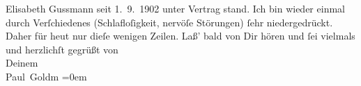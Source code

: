 \begin{ledgroupsized}[t]{13cm}
{{{                     Elisabeth Gussmann seit 1. 9. 1902 unter Vertrag stand}}}\label{K_L03229-9h}.\pend
           \pstart
           Ich bin wieder einmal durch Verſchiedenes (Schlafloſigkeit, nervöſe Störungen) ſehr
                  {\pb}niedergedrückt. Daher für heut nur dieſe wenigen Zeilen.\pend
           \pstart
           Laß’ bald von Dir hören und ſei vielmals und herzlichſt gegrüßt von {\\[\baselineskip]}Deinem {\\[\baselineskip]}\spacefill\mbox{Paul Goldm}\pend
           \leftskip=0em{}
         
         \endnumbering{}\end{ledgroupsized}  \newcommand{\dateiname}{L03229}\newcommand{\titel}{Paul Goldmann an Arthur Schnitzler, 10. 11. [1902]}\newcommand{\editorInnen}{Martin Anton Müller und Laura Untner}
      